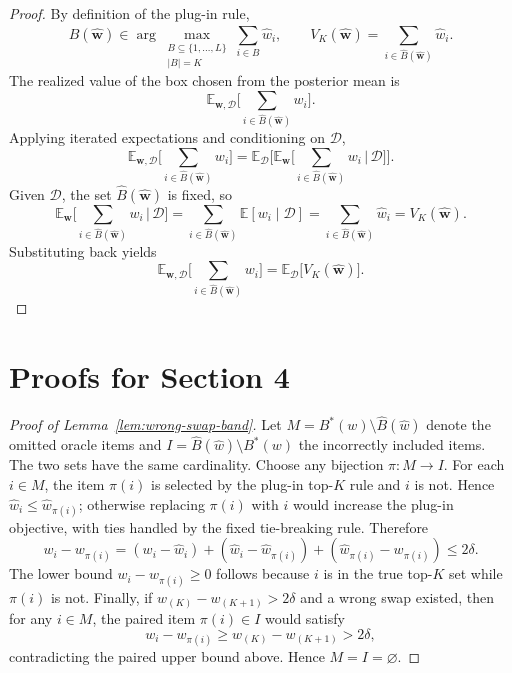 \documentclass[11pt]{article}
\theoremstyle{definition}
\theoremstyle{remark}
\newcommand{\E}{\mathbb{E}}
\newcommand{\1}{\mathbf{1}}
\newcommand{\w}{\mathbf{w}}
\newcommand{\cD}{\mathcal{D}}
\begin{document}
\begin{proof}
By definition of the plug-in rule,
\[
\hat B(\hat{\w})\in
\arg\max_{\substack{B\subseteq\{1,\ldots,L\}\\ |B|=K}}
\sum_{i\in B}\hat w_i,
\qquad
V_K(\hat{\w})=\sum_{i\in \hat B(\hat{\w})}\hat w_i.
\]
The realized value of the box chosen from the posterior mean is
\[
\E_{\w,\cD}\!\Big[\sum_{i\in \hat B(\hat{\w})} w_i\Big].
\]
Applying iterated expectations and conditioning on \(\cD\),
\[
\E_{\w,\cD}\!\Big[\sum_{i\in \hat B(\hat{\w})} w_i\Big]
=
\E_{\cD}\!\Big[\E_{\w}\!\Big[\sum_{i\in \hat B(\hat{\w})} w_i\,\Big|\,\cD\Big]\Big].
\]
Given \(\cD\), the set \(\hat B(\hat{\w})\) is fixed, so
\[
\E_{\w}\!\Big[\sum_{i\in \hat B(\hat{\w})} w_i\,\Big|\,\cD\Big]
=
\sum_{i\in \hat B(\hat{\w})}\E[w_i\mid\cD]
=
\sum_{i\in \hat B(\hat{\w})}\hat w_i
=
V_K(\hat{\w}).
\]
Substituting back yields
\[
\E_{\w,\cD}\!\Big[\sum_{i\in \hat B(\hat{\w})} w_i\Big]
=
\E_{\cD}\!\big[V_K(\hat{\w})\big].
\]
\end{proof}


\section{Proofs for Section 4}

\begin{proof}[Proof of Lemma~\ref{lem:wrong-swap-band}]
Let \(M=B^*(w)\setminus \hat B(\hat w)\) denote the omitted oracle items
and \(I=\hat B(\hat w)\setminus B^*(w)\) the incorrectly included items.
The two sets have the same cardinality. Choose any bijection
\(\pi:M\to I\). For each \(i\in M\), the item \(\pi(i)\) is selected by
the plug-in top-\(K\) rule and \(i\) is not. Hence
\(\hat w_i\le \hat w_{\pi(i)}\); otherwise replacing \(\pi(i)\) with
\(i\) would increase the plug-in objective, with ties handled by the
fixed tie-breaking rule. Therefore
\[
w_i-w_{\pi(i)}
=
(w_i-\hat w_i)+(\hat w_i-\hat w_{\pi(i)})
  +(\hat w_{\pi(i)}-w_{\pi(i)})
\le 2\delta .
\]
The lower bound \(w_i-w_{\pi(i)}\ge0\) follows because \(i\) is in the
true top-\(K\) set while \(\pi(i)\) is not. Finally, if
\(w_{(K)}-w_{(K+1)}>2\delta\) and a wrong swap existed, then
for any \(i\in M\), the paired item \(\pi(i)\in I\) would satisfy
\[
w_i-w_{\pi(i)}\ge w_{(K)}-w_{(K+1)}>2\delta,
\]
contradicting the paired upper bound above. Hence \(M=I=\varnothing\).
\end{proof}
\end{document}
